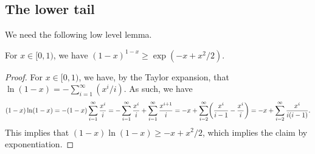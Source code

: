 

\subsection{The lower tail}

We need the following low level lemma.
\begin{lemma}
    For $x \in [0,1)$, we have $(1-x)^{1-x} \geq \exp( -x + x^2/2)$.
\end{lemma}
\begin{proof}
    For $x \in [0,1)$, we have, by the Taylor expansion, that
    $\ln (1-x) = - \sum_{i=1}^\infty ({x^i}/{i})$. As such, we have
    \begin{equation*}
        (1-x)\ln(1-x) %
        =%
        - (1-x) \sum_{i=1}^\infty \frac{x^i}{i}
        =%
        -  \sum_{i=1}^\infty \frac{x^i}{i}
        +  \sum_{i=1}^\infty \frac{x^{i+1}}{i}
        =%
        -x + \sum_{i=2}^\infty \pth{\frac{x^i}{i-1} -\frac{x^i}{i}}%
        =%
        -x + \sum_{i=2}^\infty \frac{x^i}{i(i-1)}.
    \end{equation*}
    This implies that $(1-x)\ln(1-x) \geq -x + x^2/2$, which implies
    the claim by exponentiation.
\end{proof}

